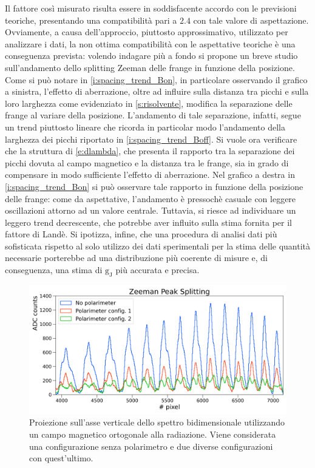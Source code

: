 \documentclass[twocolumn,10pt]{asme2ej}
\begin{document}
\vspace{-5pt}
Il fattore così misurato risulta essere in soddisfacente accordo con le previsioni teoriche, presentando una
compatibilità pari a $2.4$ con tale valore di aspettazione. Ovviamente, a causa dell'approccio, piuttosto
approssimativo, utilizzato per analizzare i dati, la non ottima compatibilità con le aspettative teoriche è una
conseguenza prevista: volendo indagare più a fondo si propone un breve studio sull'andamento dello splitting Zeeman
delle frange in funzione della posizione. Come si può notare in \autoref{i:spacing_trend_Bon}, in particolare osservando
il grafico a sinistra, l'effetto di aberrazione, oltre ad influire sulla distanza tra picchi e sulla loro larghezza come
evidenziato in \autoref{s:risolvente}, modifica la separazione delle frange al variare della posizione. L'andamento di
tale separazione, infatti, segue un trend piuttosto lineare che ricorda in particolar modo l'andamento della larghezza
dei picchi riportato in \autoref{i:spacing_trend_Boff}. Si vuole ora verificare che la struttura di \autoref{e:dlambda},
che presenta il rapporto tra la separazione dei picchi dovuta al campo magnetico e la distanza tra le frange, sia in
grado di compensare in modo sufficiente l'effetto di aberrazione. Nel grafico a destra in \autoref{i:spacing_trend_Bon}
si può osservare tale rapporto in funzione della posizione delle frange: come da aspettative, l'andamento è pressochè
casuale con leggere oscillazioni attorno ad un valore centrale. Tuttavia, si riesce ad individuare un leggero trend
decrescente, che potrebbe aver influito sulla stima fornita per il fattore di Landè. Si ipotizza, infine, che una
procedura di analisi dati più sofisticata rispetto al solo utilizzo dei dati sperimentali per la stima delle quantità
necessarie porterebbe ad una distribuzione più coerente di misure e, di conseguenza, una stima di $ \text{g}_{\text{J}}$
più accurata e precisa.


\begin{figure}
    \centering
    \includegraphics[width=\linewidth]{../Plots/Bon_overlap_small.png}
    \caption{Proiezione sull'asse verticale dello spettro bidimensionale utilizzando un campo magnetico ortogonale alla
    radiazione. Viene considerata una configurazione senza polarimetro e due diverse configurazioni con quest'ultimo.}
    \label{i:spettro2d_overlap}
    \vspace{-10pt}
\end{figure}
\end{document}
